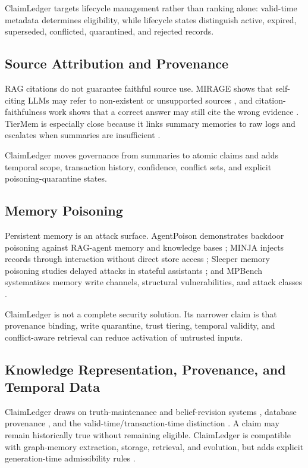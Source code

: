 ClaimLedger targets lifecycle management rather than ranking alone: valid-time metadata determines eligibility, while lifecycle states distinguish active, expired, superseded, conflicted, quarantined, and rejected records.

\subsection{Source Attribution and Provenance}\label{sec:related-provenance}

RAG citations do not guarantee faithful source use. MIRAGE shows that self-citing LLMs may refer to non-existent or unsupported sources \cite{qi2024mirage}, and citation-faithfulness work shows that a correct answer may still cite the wrong evidence \cite{wallat2025correctness}. TierMem is especially close because it links summary memories to raw logs and escalates when summaries are insufficient \cite{zhu2026tiermem}.

ClaimLedger moves governance from summaries to atomic claims and adds temporal scope, transaction history, confidence, conflict sets, and explicit poisoning-quarantine states.

\subsection{Memory Poisoning}\label{sec:related-poisoning}

Persistent memory is an attack surface. AgentPoison demonstrates backdoor poisoning against RAG-agent memory and knowledge bases \cite{chen2024agentpoison}; MINJA injects records through interaction without direct store access \cite{dong2025minja}; Sleeper memory poisoning studies delayed attacks in stateful assistants \cite{pulipaka2026sleeper}; and MPBench systematizes memory write channels, structural vulnerabilities, and attack classes \cite{dash2026mpbench}.

ClaimLedger is not a complete security solution. Its narrower claim is that provenance binding, write quarantine, trust tiering, temporal validity, and conflict-aware retrieval can reduce activation of untrusted inputs.

\subsection{Knowledge Representation, Provenance, and Temporal Data}\label{sec:related-knowledge-rep}

ClaimLedger draws on truth-maintenance and belief-revision systems \cite{doyle1979tms,dekleer1986atms,agm1985belief}, database provenance \cite{green2007provenance,cheney2009provenance}, and the valid-time/transaction-time distinction \cite{snodgrass1995temporal}. A claim may remain historically true without remaining eligible. ClaimLedger is compatible with graph-memory extraction, storage, retrieval, and evolution, but adds explicit generation-time admissibility rules \cite{yang2026graphmemory}.

